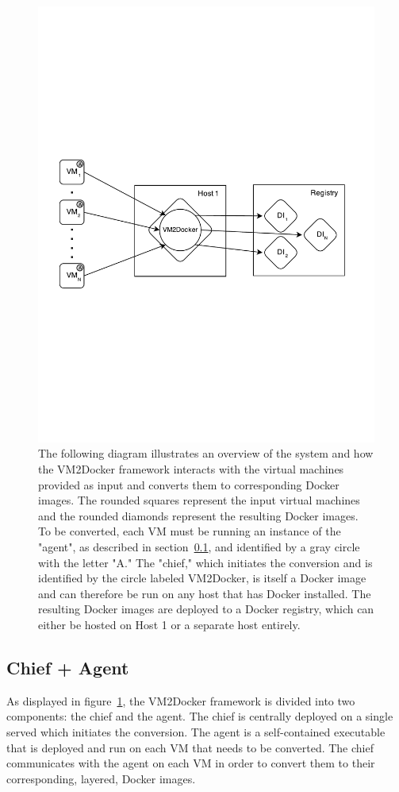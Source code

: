 \begin{figure}[h]
\centering

    \includegraphics[width=1.0\textwidth]{system2.pdf}
    \caption{The following diagram illustrates an overview of the system and how the VM2Docker framework interacts with the virtual machines provided as input and converts them to corresponding Docker images. The rounded squares represent the input virtual machines and the rounded diamonds represent the resulting Docker images. To be converted, each VM must be running an instance of the "agent", as described in section~\ref{sec:agent}, and identified by a gray circle with the letter "A." The "chief," which initiates the conversion and is identified by the circle labeled VM2Docker, is itself a Docker image and can therefore be run on any host that has Docker installed. The resulting Docker images are deployed to a Docker registry, which can either be hosted on Host 1 or a separate host entirely. }
   \label{fig:sys}
\end{figure}
\subsection{Chief + Agent}
\label{sec:agent}
As displayed in figure~\ref{fig:sys}, the VM2Docker framework is divided into two components: the chief and the agent. The chief is centrally deployed on a single served which initiates the conversion. The agent is a self-contained executable that is deployed and run on each VM that needs to be converted. The chief communicates with the agent on each VM in order to convert them to their corresponding, layered, Docker images.  

